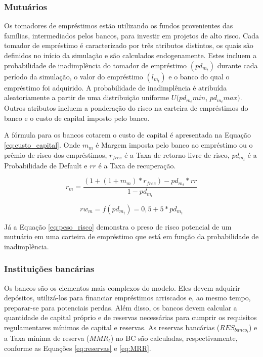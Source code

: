 \documentclass[hidelinks, article,12pt,oneside,a4paper,english,brazil,sumario=tradicional]{abntex2}
\begin{document}
\subsubsection{Mutuários}

Os tomadores de empréstimos estão utilizando os fundos provenientes das famílias, intermediados pelos bancos, para investir em projetos de alto risco. Cada tomador de empréstimo é caracterizado por três atributos distintos, os quais são definidos no início da simulação e são calculados endogenamente. Estes incluem a probabilidade de inadimplência do tomador de empréstimo $(pd_{m_{t}})$ durante cada período da simulação, o valor do empréstimo $(l_{m_{t}})$ e o banco do qual o empréstimo foi adquirido. A probabilidade de inadimplência é atribuída aleatoriamente a partir de uma distribuição uniforme $U(pd_{m_{t}}min$, $pd_{m_{t}}max)$. Outros atributos incluem a ponderação do risco na carteira de empréstimos do banco e o custo de capital imposto pelo banco.

A fórmula para os bancos cotarem o custo de capital é apresentada na Equação \ref{eq:custo_capital}. Onde $m_{m}$ é Margem imposta pelo banco ao empréstimo ou o prêmio de risco dos empréstimos, $r_{free}$ é a Taxa de retorno livre de risco, $pd_{m_{t}}$ é a Probabilidade de Default e $rr$ é a Taxa de recuperação. 

\begin{equation} \label{eq:custo_capital}
r_{m} = \frac{(1 + (1+m_{m})*r_{free}) - pd_{m_{t}} * rr}{1 - pd_{m_{t}}}
\end{equation}

\begin{equation} \label{eq:peso_risco}
rw_{m} = f(pd_{m_{t}}) = 0,5 + 5*pd_{m_{t}} 
\end{equation}

Já a Equação \ref{eq:peso_risco} demonstra o preso de risco potencial de um mutuário em uma carteira de empréstimo que está em função da probabilidade de inadimplência.  

\subsubsection{Instituições bancárias}

Os bancos são os elementos mais complexos do modelo. Eles devem adquirir depósitos, utilizá-los para financiar empréstimos arriscados e, ao mesmo tempo, preparar-se para potenciais perdas. Além disso, os bancos devem calcular a quantidade de capital próprio e de reservas necessárias para cumprir os requisitos regulamentares mínimos de capital e reservas. As reservas bancárias ($RES_{banco_{t}}$) e a Taxa mínima de reserva ($MMR_{t}$) no BC são calculadas, respectivamente, conforme as Equações \ref{eq:reservas} e \ref{eq:MRR}. 
\end{document}

